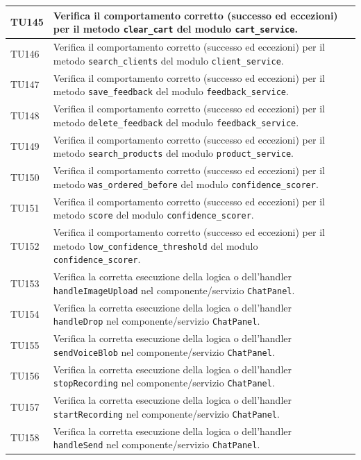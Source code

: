 \documentclass[a4paper,11pt,oneside]{scrartcl}
\begin{document}
\begin{longtable}{|p{1.9cm}|p{11.6cm}|c|}
TU145 & Verifica il comportamento corretto (successo ed eccezioni) per il metodo \texttt{clear\_cart} del modulo \texttt{cart\_service}. & \\ \hline
TU146 & Verifica il comportamento corretto (successo ed eccezioni) per il metodo \texttt{search\_clients} del modulo \texttt{client\_service}. & \\ \hline
TU147 & Verifica il comportamento corretto (successo ed eccezioni) per il metodo \texttt{save\_feedback} del modulo \texttt{feedback\_service}. & \\ \hline
TU148 & Verifica il comportamento corretto (successo ed eccezioni) per il metodo \texttt{delete\_feedback} del modulo \texttt{feedback\_service}. & \\ \hline
TU149 & Verifica il comportamento corretto (successo ed eccezioni) per il metodo \texttt{search\_products} del modulo \texttt{product\_service}. & \\ \hline
TU150 & Verifica il comportamento corretto (successo ed eccezioni) per il metodo \texttt{was\_ordered\_before} del modulo \texttt{confidence\_scorer}. & \\ \hline
TU151 & Verifica il comportamento corretto (successo ed eccezioni) per il metodo \texttt{score} del modulo \texttt{confidence\_scorer}. & \\ \hline
TU152 & Verifica il comportamento corretto (successo ed eccezioni) per il metodo \texttt{low\_confidence\_threshold} del modulo \texttt{confidence\_scorer}. & \\ \hline
TU153 & Verifica la corretta esecuzione della logica o dell'handler \texttt{handleImageUpload} nel componente/servizio \texttt{ChatPanel}. & \\ \hline
TU154 & Verifica la corretta esecuzione della logica o dell'handler \texttt{handleDrop} nel componente/servizio \texttt{ChatPanel}. & \\ \hline
TU155 & Verifica la corretta esecuzione della logica o dell'handler \texttt{sendVoiceBlob} nel componente/servizio \texttt{ChatPanel}. & \\ \hline
TU156 & Verifica la corretta esecuzione della logica o dell'handler \texttt{stopRecording} nel componente/servizio \texttt{ChatPanel}. & \\ \hline
TU157 & Verifica la corretta esecuzione della logica o dell'handler \texttt{startRecording} nel componente/servizio \texttt{ChatPanel}. & \\ \hline
TU158 & Verifica la corretta esecuzione della logica o dell'handler \texttt{handleSend} nel componente/servizio \texttt{ChatPanel}. & \\ \hline

\end{longtable}
\end{document}
